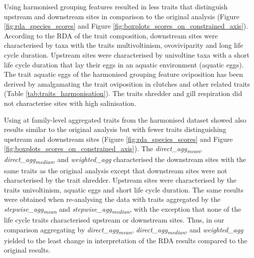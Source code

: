 \documentclass{article}
\begin{document}
Using harmonised grouping features resulted in less traits that distinguish upstream and downstream sites in comparison to the original analysis (Figure \ref{fig:rda_species_scores} and Figure \ref{fig:boxplots_scores_on_constrained_axis}). According to the RDA of the trait composition, downstream sites were characterised by taxa with the traits multivoltinism, ovoviviparity and long life cycle duration. Upstream sites were characterised by univoltine taxa with a short life cycle duration that lay their eggs in an aquatic environment (aquatic eggs). The trait aquatic eggs of the harmonised grouping feature oviposition has been derived by amalgamating the trait oviposition in clutches and other related traits (Table \ref{tab:traits_harmonisation}). The traits shredder and gill respiration did not characterise sites with high salinisation.

Using at family-level aggregated traits from the harmonised dataset showed also results similar to the original analysis but with fewer traits distinguishing upstream and downstream sites (Figure \ref{fig:rda_species_scores} and Figure \ref{fig:boxplots_scores_on_constrained_axis}). The \textit{direct\_agg\textsubscript{mean}}, \textit{direct\_agg\textsubscript{median}}, and \textit{weighted\_agg} 
characterised the downstream sites with the same traits as the original analysis except that downstream sites were not characterised by the trait shredder. Upstream sites were characterised by the traits univoltinism, aquatic eggs and short life cycle duration. The same results were obtained when re-analysing the data with traits aggregated by the \textit{stepwise\_agg\textsubscript{mean}} and \textit{stepwise\_agg\textsubscript{median}}, with the exception that none of the life cycle traits characterised upstream or downstream sites. Thus, in our comparison aggregating by \textit{direct\_agg\textsubscript{mean}}, \textit{direct\_agg\textsubscript{median}}, and \textit{weighted\_agg} yielded to the least change in interpretation of the RDA results compared to the original results.
\end{document}
